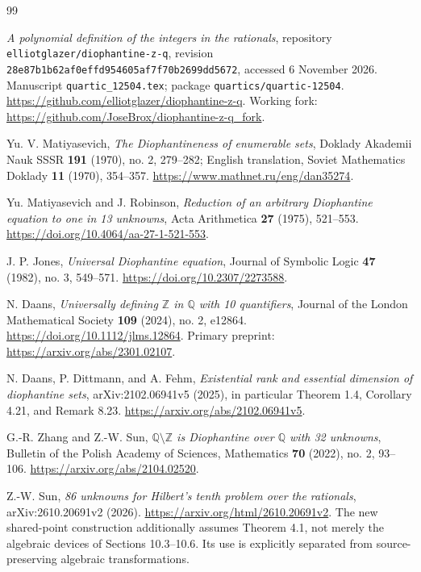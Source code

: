 \documentclass[11pt]{article}
\theoremstyle{definition}
\newcommand{\Q}{\mathbb Q}
\newcommand{\Z}{\mathbb Z}
\begin{document}
\begin{thebibliography}{99}

\emph{A polynomial definition of the integers in the rationals},
repository \texttt{elliotglazer/diophantine-z-q}, revision
\texttt{28e87b1b62af0effd954605af7f70b2699dd5672}, accessed
6 November 2026. Manuscript \texttt{quartic\_12504.tex}; package
\texttt{quartics/quartic-12504}.
\url{https://github.com/elliotglazer/diophantine-z-q}.
Working fork: \url{https://github.com/JoseBrox/diophantine-z-q_fork}.

Yu. V. Matiyasevich, \emph{The Diophantineness of enumerable sets},
Doklady Akademii Nauk SSSR \textbf{191} (1970), no. 2, 279--282;
English translation, Soviet Mathematics Doklady \textbf{11} (1970),
354--357. \url{https://www.mathnet.ru/eng/dan35274}.

Yu. Matiyasevich and J. Robinson, \emph{Reduction of an arbitrary
Diophantine equation to one in 13 unknowns}, Acta Arithmetica
\textbf{27} (1975), 521--553.
\url{https://doi.org/10.4064/aa-27-1-521-553}.

J. P. Jones, \emph{Universal Diophantine equation}, Journal of Symbolic
Logic \textbf{47} (1982), no. 3, 549--571.
\url{https://doi.org/10.2307/2273588}.

N. Daans, \emph{Universally defining $\Z$ in $\Q$ with 10 quantifiers},
Journal of the London Mathematical Society \textbf{109} (2024), no. 2,
e12864. \url{https://doi.org/10.1112/jlms.12864}.
Primary preprint: \url{https://arxiv.org/abs/2301.02107}.

N. Daans, P. Dittmann, and A. Fehm, \emph{Existential rank and
essential dimension of diophantine sets}, arXiv:2102.06941v5 (2025),
in particular Theorem 1.4, Corollary 4.21, and Remark 8.23.
\url{https://arxiv.org/abs/2102.06941v5}.

G.-R. Zhang and Z.-W. Sun, \emph{$\Q\setminus\Z$ is Diophantine
over $\Q$ with 32 unknowns}, Bulletin of the Polish Academy of Sciences,
Mathematics \textbf{70} (2022), no. 2, 93--106.
\url{https://arxiv.org/abs/2104.02520}.

Z.-W. Sun, \emph{86 unknowns for Hilbert's tenth problem over the
rationals}, arXiv:2610.20691v2 (2026).
\url{https://arxiv.org/html/2610.20691v2}.
The new shared-point construction additionally assumes Theorem 4.1,
not merely the algebraic devices of Sections 10.3--10.6. Its use is
explicitly separated from source-preserving algebraic transformations.


\end{thebibliography}
\end{document}
